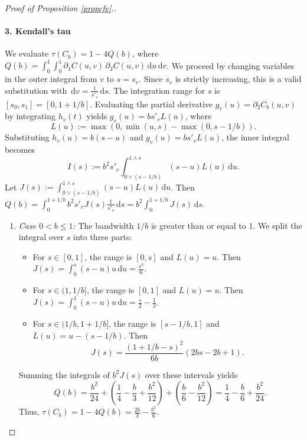 \documentclass{article}
\theoremstyle{plain}
\theoremstyle{definition}
\newcommand{\de}{\mathrm{\,d}}
\begin{document}
\begin{proof}[Proof of Proposition \ref{propcfe}.]
\paragraph{3. Kendall's tau}
We evaluate \(\tau(C_b) = 1 - 4Q(b)\), where \(Q(b) = \int_0^1 \int_0^1 \partial_1 C(u,v) \, \partial_2 C(u,v) \de u \de v\).
We proceed by changing variables in the outer integral from \(v\) to \(s = s_v\). Since \(s_v\) is strictly increasing, this is a valid substitution with \(\de v = \frac{1}{s'_v} \de s\).
The integration range for \(s\) is \([s_0, s_1] = [0, 1+1/b]\).
Evaluating the partial derivative \(g_v(u) = \partial_2 C_b(u,v)\) by integrating \(h_v(t)\) yields \(g_v(u) = b s'_v L(u)\), where
\[
L(u) := \max(0, \min(u, s) - \max(0, s-1/b))
.\]
Substituting \(h_v(u) = b(s-u)\) and \(g_v(u) = b s'_v L(u)\), the inner integral becomes
\[
    I(s)
    := b^2 s'_v \int_{0 \vee (s-1/b)}^{1 \wedge s} (s-u)L(u) \de u.
\]
Let \(J(s) := \int_{0 \vee (s-1/b)}^{1 \wedge s} (s-u)L(u) \de u\). Then \(Q(b) = \int_0^{1+1/b} b^2 s'_v J(s) \frac{1}{s'_v} \de s = b^2 \int_0^{1+1/b} J(s) \de s\).

\begin{enumerate}[label=(\roman*), font=\upshape]
    \item \emph{Case \(0 < b \le 1\):} The bandwidth \(1/b\) is greater than or equal to \(1\). We split the integral over \(s\) into three parts:
    \begin{itemize}
        \item For \(s \in [0, 1]\), the range is \([0,s]\) and \(L(u) = u\). Then \(J(s) = \int_0^s (s-u)u \de u = \frac{s^3}{6}\).
        \item For \(s \in (1, 1/b]\), the range is \([0,1]\) and \(L(u) = u\). Then \(J(s) = \int_0^1 (s-u)u \de u = \frac{s}{2} - \frac{1}{3}\).
        \item For \(s \in (1/b, 1+1/b]\), the range is \([s-1/b, 1]\) and \(L(u) = u - (s-1/b)\). Then
        \[
        J(s) = \frac{(1+1/b-s)^2}{6b}(2bs - 2b + 1)
        .\]
    \end{itemize}
    Summing the integrals of \(b^2 J(s)\) over these intervals yields
    \[
        Q(b) = \frac{b^2}{24} + \left(\frac{1}{4} - \frac{b}{3} + \frac{b^2}{12}\right) + \left(\frac{b}{6} - \frac{b^2}{12}\right) = \frac{1}{4} - \frac{b}{6} + \frac{b^2}{24}.
    \]
    Thus, \(\tau(C_b) = 1 - 4Q(b) = \frac{2b}{3} - \frac{b^2}{6}\).


\end{enumerate}
\end{proof}
\end{document}
